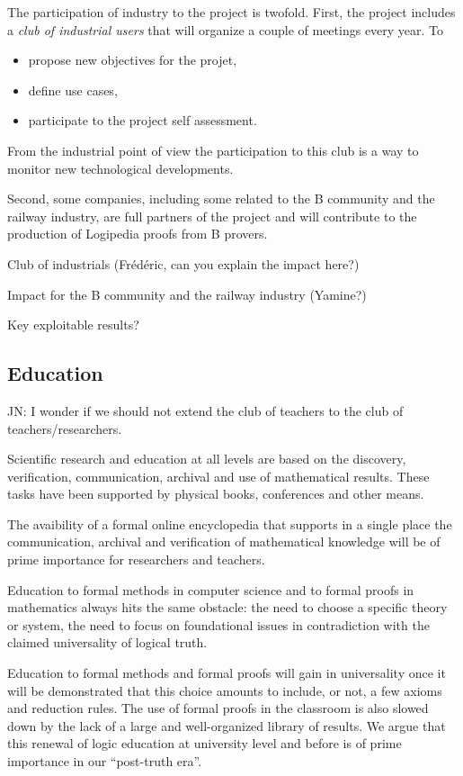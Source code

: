 The participation of industry to the project is twofold. First,
the project includes a {\em club of industrial users} that will
organize a couple of meetings every year. To
\begin{itemize}
\item propose new objectives for the projet,
\item define use cases,
\item participate to the project self assessment.
\end{itemize}

From the industrial point of view the participation to this club
is a way to monitor new technological developments.

Second, some companies, including some related to the {\sc B} community
and the railway industry, are full partners of the project and
will contribute to the production of {\sc Logipedia} proofs from
{\sc B} provers. 

{\color{red} Club of industrials (Frédéric, can 
you explain the impact here?)}

{\color{red} Impact for the {\sc B} community and the railway industry
  (Yamine?)}

{\color{red} Key exploitable results?}

\subsection{Education}

{\color{red} JN: I wonder if we should not extend the club of teachers to the club of teachers/researchers.}

Scientific research and education at all levels are based on the discovery,
verification, communication, archival and use of mathematical results.
These tasks have been supported by physical books, conferences and other means.

The avaibility of a formal online encyclopedia that supports in a single place
the communication, archival and verification of mathematical  knowledge will be
of prime importance for researchers and teachers.

Education to formal methods in computer science and to formal proofs
in mathematics always hits the same obstacle: the need to choose a
specific theory or system, the need to focus on foundational issues in
contradiction with the claimed universality of logical truth.

Education to formal methods and formal proofs will gain in universality once it
will be demonstrated that this choice amounts to include, or not, a few axioms
and reduction rules. 
The use of formal proofs in the classroom is also slowed down by the lack of a
large and well-organized library of results.
We argue that this renewal of logic education at university level and before is
of prime importance in our ``post-truth era''.

